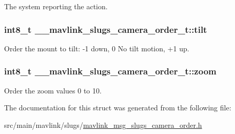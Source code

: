 The system reporting the action. 

\hypertarget{struct____mavlink__slugs__camera__order__t_a896de0281b7c400283ec5b04f76ac354}{
\subsubsection[{tilt}]{\setlength{\rightskip}{0pt plus 5cm}int8\+\_\+t \+\_\+\+\_\+mavlink\+\_\+slugs\+\_\+camera\+\_\+order\+\_\+t\+::tilt}}\label{struct____mavlink__slugs__camera__order__t_a896de0281b7c400283ec5b04f76ac354}


Order the mount to tilt\+: -\/1 down, 0 No tilt motion, +1 up. 

\hypertarget{struct____mavlink__slugs__camera__order__t_a5447cfb35f2c99e9ee4d6b439aadb43f}{
\subsubsection[{zoom}]{\setlength{\rightskip}{0pt plus 5cm}int8\+\_\+t \+\_\+\+\_\+mavlink\+\_\+slugs\+\_\+camera\+\_\+order\+\_\+t\+::zoom}}\label{struct____mavlink__slugs__camera__order__t_a5447cfb35f2c99e9ee4d6b439aadb43f}


Order the zoom values 0 to 10. 



The documentation for this struct was generated from the following file\+:\begin{DoxyCompactItemize}
\item 
src/main/mavlink/slugs/\hyperlink{mavlink__msg__slugs__camera__order_8h}{mavlink\+\_\+msg\+\_\+slugs\+\_\+camera\+\_\+order.\+h}\end{DoxyCompactItemize}

